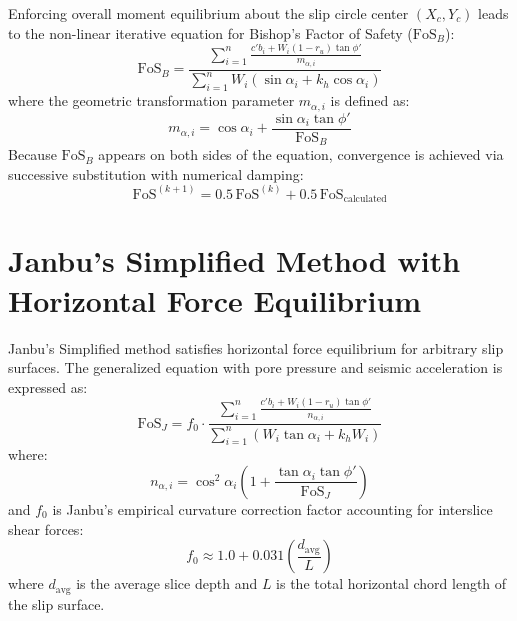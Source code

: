 \documentclass[12pt,a4paper,oneside]{report}
\begin{document}
Enforcing overall moment equilibrium about the slip circle center $(X_c, Y_c)$ leads to the non-linear iterative equation for Bishop's Factor of Safety ($\text{FoS}_B$):
\begin{equation}
  \text{FoS}_B = \frac{\displaystyle\sum_{i=1}^{n} \frac{c' b_i + W_i(1 - r_u)\tan \phi'}{m_{\alpha,i}}}{\displaystyle\sum_{i=1}^{n} W_i \left(\sin \alpha_i + k_h \cos \alpha_i \right)}
\end{equation}
where the geometric transformation parameter $m_{\alpha,i}$ is defined as:
\begin{equation}
  m_{\alpha,i} = \cos \alpha_i + \frac{\sin \alpha_i \tan \phi'}{\text{FoS}_B}
\end{equation}
Because $\text{FoS}_B$ appears on both sides of the equation, convergence is achieved via successive substitution with numerical damping:
\begin{equation}
  \text{FoS}^{(k+1)} = 0.5\,\text{FoS}^{(k)} + 0.5\,\text{FoS}_{\text{calculated}}
\end{equation}

\section{Janbu's Simplified Method with Horizontal Force Equilibrium}
Janbu's Simplified method satisfies horizontal force equilibrium for arbitrary slip surfaces. The generalized equation with pore pressure and seismic acceleration is expressed as:
\begin{equation}
  \text{FoS}_J = f_0 \cdot \frac{\displaystyle\sum_{i=1}^{n} \frac{c' b_i + W_i(1 - r_u)\tan \phi'}{n_{\alpha,i}}}{\displaystyle\sum_{i=1}^{n} \left( W_i \tan \alpha_i + k_h W_i \right)}
\end{equation}
where:
\begin{equation}
  n_{\alpha,i} = \cos^2 \alpha_i \left(1 + \frac{\tan \alpha_i \tan \phi'}{\text{FoS}_J}\right)
\end{equation}
and $f_0$ is Janbu's empirical curvature correction factor accounting for interslice shear forces:
\begin{equation}
  f_0 \approx 1.0 + 0.031 \left(\frac{d_{\text{avg}}}{L}\right)
\end{equation}
where $d_{\text{avg}}$ is the average slice depth and $L$ is the total horizontal chord length of the slip surface.
\end{document}
